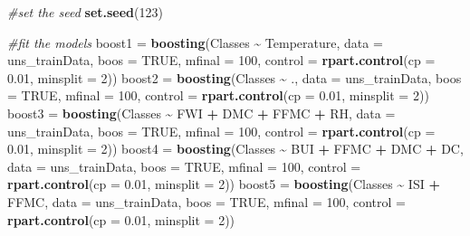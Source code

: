 \documentclass[
]{article}
\newenvironment{Shaded}{\begin{snugshade}}{\end{snugshade}}
\newcommand{\AttributeTok}[1]{\textcolor[rgb]{0.13,0.29,0.53}{#1}}
\newcommand{\CommentTok}[1]{\textcolor[rgb]{0.56,0.35,0.01}{\textit{#1}}}
\newcommand{\ConstantTok}[1]{\textcolor[rgb]{0.56,0.35,0.01}{#1}}
\newcommand{\DecValTok}[1]{\textcolor[rgb]{0.00,0.00,0.81}{#1}}
\newcommand{\FloatTok}[1]{\textcolor[rgb]{0.00,0.00,0.81}{#1}}
\newcommand{\FunctionTok}[1]{\textcolor[rgb]{0.13,0.29,0.53}{\textbf{#1}}}
\newcommand{\NormalTok}[1]{#1}
\newcommand{\OtherTok}[1]{\textcolor[rgb]{0.56,0.35,0.01}{#1}}
\newcommand{\SpecialCharTok}[1]{\textcolor[rgb]{0.81,0.36,0.00}{\textbf{#1}}}
\begin{document}
\begin{Shaded}
\begin{Highlighting}[]
\CommentTok{\#set the seed}
\FunctionTok{set.seed}\NormalTok{(}\DecValTok{123}\NormalTok{)}

\CommentTok{\#fit the models}
\NormalTok{boost1 }\OtherTok{=} \FunctionTok{boosting}\NormalTok{(Classes }\SpecialCharTok{\textasciitilde{}}\NormalTok{ Temperature, }\AttributeTok{data =}\NormalTok{ uns\_trainData, }\AttributeTok{boos =} \ConstantTok{TRUE}\NormalTok{, }\AttributeTok{mfinal =} \DecValTok{100}\NormalTok{, }\AttributeTok{control =} \FunctionTok{rpart.control}\NormalTok{(}\AttributeTok{cp =} \FloatTok{0.01}\NormalTok{, }\AttributeTok{minsplit =} \DecValTok{2}\NormalTok{))}
\NormalTok{boost2 }\OtherTok{=} \FunctionTok{boosting}\NormalTok{(Classes }\SpecialCharTok{\textasciitilde{}}\NormalTok{ ., }\AttributeTok{data =}\NormalTok{ uns\_trainData, }\AttributeTok{boos =} \ConstantTok{TRUE}\NormalTok{, }\AttributeTok{mfinal =} \DecValTok{100}\NormalTok{, }\AttributeTok{control =} \FunctionTok{rpart.control}\NormalTok{(}\AttributeTok{cp =} \FloatTok{0.01}\NormalTok{, }\AttributeTok{minsplit =} \DecValTok{2}\NormalTok{))}
\NormalTok{boost3 }\OtherTok{=} \FunctionTok{boosting}\NormalTok{(Classes }\SpecialCharTok{\textasciitilde{}}\NormalTok{ FWI }\SpecialCharTok{+}\NormalTok{ DMC }\SpecialCharTok{+}\NormalTok{ FFMC }\SpecialCharTok{+}\NormalTok{ RH, }\AttributeTok{data =}\NormalTok{ uns\_trainData, }\AttributeTok{boos =} \ConstantTok{TRUE}\NormalTok{, }\AttributeTok{mfinal =} \DecValTok{100}\NormalTok{, }\AttributeTok{control =} \FunctionTok{rpart.control}\NormalTok{(}\AttributeTok{cp =} \FloatTok{0.01}\NormalTok{, }\AttributeTok{minsplit =} \DecValTok{2}\NormalTok{))}
\NormalTok{boost4 }\OtherTok{=} \FunctionTok{boosting}\NormalTok{(Classes }\SpecialCharTok{\textasciitilde{}}\NormalTok{ BUI }\SpecialCharTok{+}\NormalTok{ FFMC }\SpecialCharTok{+}\NormalTok{ DMC }\SpecialCharTok{+}\NormalTok{ DC, }\AttributeTok{data =}\NormalTok{ uns\_trainData, }\AttributeTok{boos =} \ConstantTok{TRUE}\NormalTok{, }\AttributeTok{mfinal =} \DecValTok{100}\NormalTok{, }\AttributeTok{control =} \FunctionTok{rpart.control}\NormalTok{(}\AttributeTok{cp =} \FloatTok{0.01}\NormalTok{, }\AttributeTok{minsplit =} \DecValTok{2}\NormalTok{))}
\NormalTok{boost5 }\OtherTok{=} \FunctionTok{boosting}\NormalTok{(Classes }\SpecialCharTok{\textasciitilde{}}\NormalTok{ ISI }\SpecialCharTok{+}\NormalTok{ FFMC, }\AttributeTok{data =}\NormalTok{ uns\_trainData, }\AttributeTok{boos =} \ConstantTok{TRUE}\NormalTok{, }\AttributeTok{mfinal =} \DecValTok{100}\NormalTok{, }\AttributeTok{control =} \FunctionTok{rpart.control}\NormalTok{(}\AttributeTok{cp =} \FloatTok{0.01}\NormalTok{, }\AttributeTok{minsplit =} \DecValTok{2}\NormalTok{))}


\end{Highlighting}
\end{Shaded}
\end{document}
